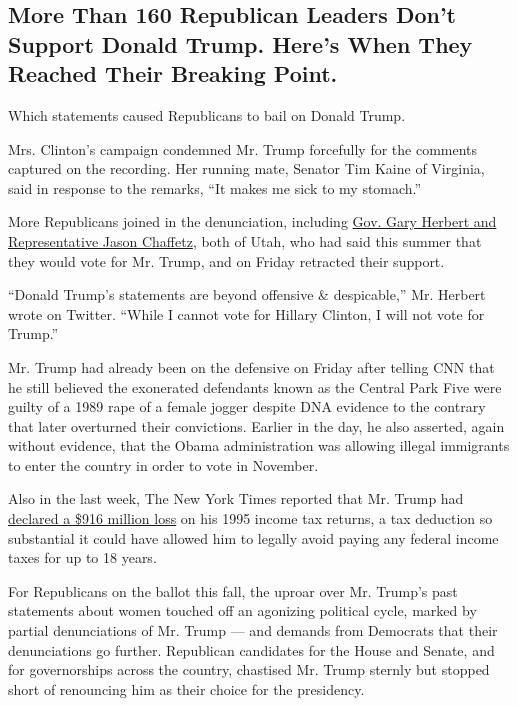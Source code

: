 \hypertarget{more-than-160-republican-leaders-dont-support-donald-trump-heres-when-they-reached-their-breaking-point}{%
\subsection{More Than 160 Republican Leaders Don't Support Donald Trump.
Here's When They Reached Their Breaking
Point.}\label{more-than-160-republican-leaders-dont-support-donald-trump-heres-when-they-reached-their-breaking-point}}

Which statements caused Republicans to bail on Donald Trump.

Mrs. Clinton's campaign condemned Mr. Trump forcefully for the comments
captured on the recording. Her running mate, Senator Tim Kaine of
Virginia, said in response to the remarks, ``It makes me sick to my
stomach.''

More Republicans joined in the denunciation, including
\href{http://www.nytimes.com/interactive/2016/08/29/us/politics/at-least-110-republican-leaders-wont-vote-for-donald-trump-heres-when-they-reached-their-breaking-point.html\#tape}{Gov.
Gary Herbert and Representative Jason Chaffetz}, both of Utah, who had
said this summer that they would vote for Mr. Trump, and on Friday
retracted their support.

``Donald Trump's statements are beyond offensive \& despicable,'' Mr.
Herbert wrote on Twitter. ``While I cannot vote for Hillary Clinton, I
will not vote for Trump.''

Mr. Trump had already been on the defensive on Friday after telling CNN
that he still believed the exonerated defendants known as the Central
Park Five were guilty of a 1989 rape of a female jogger despite DNA
evidence to the contrary that later overturned their convictions.
Earlier in the day, he also asserted, again without evidence, that the
Obama administration was allowing illegal immigrants to enter the
country in order to vote in November.

Also in the last week, The New York Times reported that Mr. Trump had
\href{http://www.nytimes.com/2016/10/02/us/politics/donald-trump-taxes.html}{declared
a \$916 million loss} on his 1995 income tax returns, a tax deduction so
substantial it could have allowed him to legally avoid paying any
federal income taxes for up to 18 years.

For Republicans on the ballot this fall, the uproar over Mr. Trump's
past statements about women touched off an agonizing political cycle,
marked by partial denunciations of Mr. Trump --- and demands from
Democrats that their denunciations go further. Republican candidates for
the House and Senate, and for governorships across the country,
chastised Mr. Trump sternly but stopped short of renouncing him as their
choice for the presidency.

